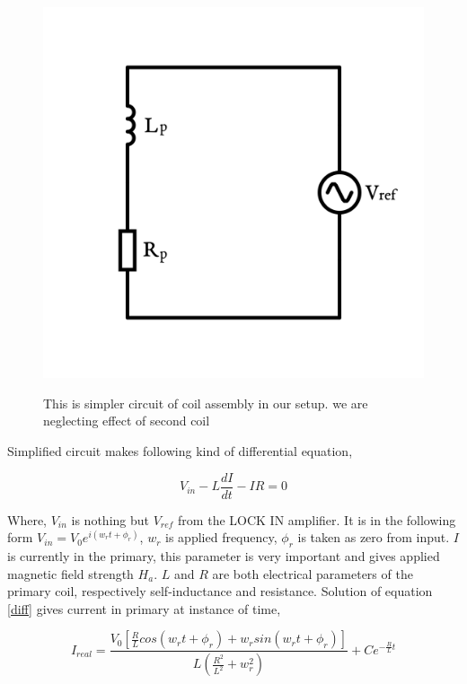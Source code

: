 \begin{figure}
  \includegraphics[width=1\linewidth]{circuit.png}
  \label{circuit}
  \caption{This is simpler circuit of coil assembly in our setup. we are neglecting effect of second coil}
\end{figure}

Simplified circuit makes following kind of differential equation,

\begin{equation}\label{diff}
  V_{in}-L\frac{dI}{dt}-IR=0
\end{equation}

Where, $V_{in}$ is nothing but $V_{ref}$ from the LOCK IN amplifier.  It is in the following form $V_{in} = V_0 e^{i(w_rt+\phi_r)}$, $w_r$ is applied frequency, $\phi_r$ is taken as zero from input. $I$ is currently in the primary, this parameter is very important and gives applied magnetic field strength $H_a$. $L$ and $R$ are both electrical parameters of the primary coil, respectively self-inductance and resistance. Solution of equation \ref{diff} gives current in primary at instance of time,

\begin{equation}
I_{real} = \frac{V_0\left[\frac{R}{L} cos(w_rt+\phi_r)+w_r sin(w_rt+\phi_r)\right]}{L(\frac{R^2}{L^2}+w_r^2)}+Ce^{-\frac{R}{L}t}  
\end{equation}

